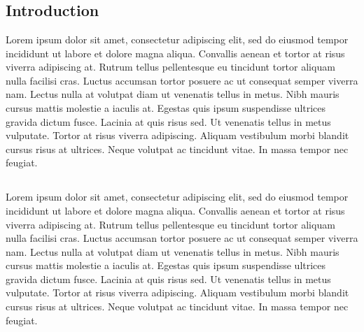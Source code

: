 \chapter{}\label{}


\newcommand{\be}{\begin{equation}}
\newcommand{\ee}{\end{equation}}
\newcommand{\bea}{\begin{eqnarray}}
\newcommand{\eea}{\end{eqnarray}}
\newcommand{\ag}{\mbox{I \hspace{-0.82em} H}}
\newcommand{\gapp}{\mathrel{\raise.3ex\hbox{$>$}\mkern-14mu
              \lower0.6ex\hbox{$\sim$}}}
\newcommand{\lapp}{\mathrel{\raise.3ex\hbox{$<$}\mkern-14mu
              \lower0.6ex\hbox{$\sim$}}}
\newcommand{\scri}{\mathscr{I}}



\section{Introduction}
Lorem ipsum dolor sit amet, consectetur adipiscing elit, sed do eiusmod tempor incididunt ut labore et dolore magna aliqua. Convallis aenean et tortor at risus viverra adipiscing at. Rutrum tellus pellentesque eu tincidunt tortor aliquam nulla facilisi cras. Luctus accumsan tortor posuere ac ut consequat semper viverra nam. Lectus nulla at volutpat diam ut venenatis tellus in metus. Nibh mauris cursus mattis molestie a iaculis at. Egestas quis ipsum suspendisse ultrices gravida dictum fusce. Lacinia at quis risus sed. Ut venenatis tellus in metus vulputate. Tortor at risus viverra adipiscing. Aliquam vestibulum morbi blandit cursus risus at ultrices. Neque volutpat ac tincidunt vitae. In massa tempor nec feugiat.

\section{}
Lorem ipsum dolor sit amet, consectetur adipiscing elit, sed do eiusmod tempor incididunt ut labore et dolore magna aliqua. Convallis aenean et tortor at risus viverra adipiscing at. Rutrum tellus pellentesque eu tincidunt tortor aliquam nulla facilisi cras. Luctus accumsan tortor posuere ac ut consequat semper viverra nam. Lectus nulla at volutpat diam ut venenatis tellus in metus. Nibh mauris cursus mattis molestie a iaculis at. Egestas quis ipsum suspendisse ultrices gravida dictum fusce. Lacinia at quis risus sed. Ut venenatis tellus in metus vulputate. Tortor at risus viverra adipiscing. Aliquam vestibulum morbi blandit cursus risus at ultrices. Neque volutpat ac tincidunt vitae. In massa tempor nec feugiat.

